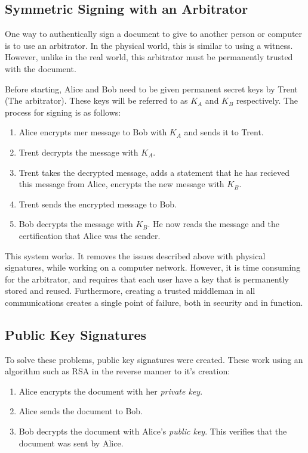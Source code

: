 		\subsection{Symmetric Signing with an Arbitrator}
			One way to authentically sign a document to give to another person or computer is to use an arbitrator. 
			In the physical world, this is similar to using a witness. 
			However, unlike in the real world, this arbitrator must be permanently trusted with the document. 

			Before starting, Alice and Bob need to be given permanent secret keys by Trent (The arbitrator). 
			These keys will be referred to as $K_A$ and $K_B$ respectively. 
			The process for signing is as follows:
			\begin{enumerate}
				\item Alice encrypts mer message to Bob with $K_A$ and sends it to Trent. 
				\item Trent decrypts the message with $K_A$. 
				\item Trent takes the decrypted message, adds a statement that he has recieved this message from Alice, encrypts the new message with $K_B$.
				\item Trent sends the encrypted message to Bob. 
				\item Bob decrypts the message with $K_B$. He now reads the message and the certification that Alice was the sender.
			\end{enumerate}

			This system works. 
			It removes the issues described above with physical signatures, while working on a computer network. 
			However, it is time consuming for the arbitrator, and requires that each user have a key that is permanently stored and reused. 
			Furthermore, creating a trusted middleman in all communications creates a single point of failure, both in security and in function. 

		\subsection{Public Key Signatures}
			To solve these problems, public key signatures were created. 
			These work using an algorithm such as RSA in the reverse manner to it's creation:
			\begin{enumerate}
				\item Alice encrypts the document with her \emph{private key}.
				\item Alice sends the document to Bob. 
				\item Bob decrypts the document with Alice's \emph{public key}. 
					This verifies that the document was sent by Alice. 
			\end{enumerate}

